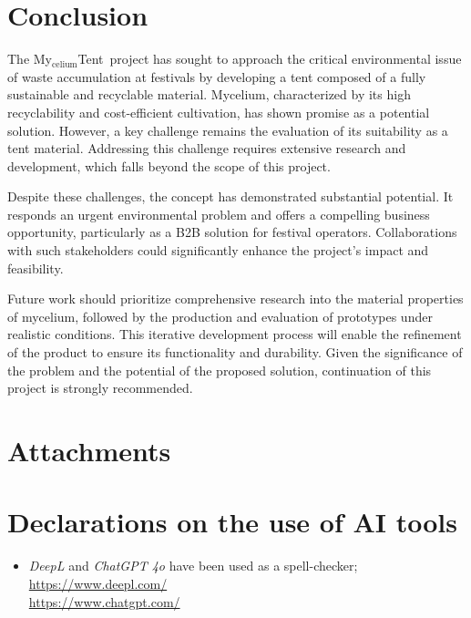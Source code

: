 \documentclass{article}
\newcommand{\myc}{My$_{\text{celium}}$Tent}
\begin{document}
\section{Conclusion}
The \myc\ project has sought to approach the critical environmental issue of waste
accumulation at festivals by developing a tent composed of a fully sustainable and recyclable
material. Mycelium, characterized by its high recyclability and cost-efficient cultivation, has
shown promise as a potential solution. However, a key challenge remains the evaluation of its
suitability as a tent material. Addressing this challenge requires extensive research and
development, which falls beyond the scope of this project.

Despite these challenges, the concept has demonstrated substantial potential. It responds
an urgent environmental problem and offers a compelling business opportunity, particularly
as a B2B solution for festival operators. Collaborations with such stakeholders could
significantly enhance the project's impact and feasibility.

Future work should prioritize comprehensive research into the material properties of
mycelium, followed by the production and evaluation of prototypes under realistic
conditions. This iterative development process will enable the refinement of the
product to ensure its functionality and durability. Given the significance of the problem
and the potential of the proposed solution, continuation of this project is strongly
recommended.

\newpage
\pagestyle{empty}
\section{Attachments}
\listoftables

\listoffigures

\section*{Declarations on the use of AI tools}
\begin{itemize}
    \item \textit{DeepL} and \textit{ChatGPT 4o} have been used as a spell-checker;\\
        \url{https://www.deepl.com/}\\
        \url{https://www.chatgpt.com/}
\end{itemize}

\setlength{\bibitemsep}{1.2\baselineskip}
\printbibliography
\end{document}
